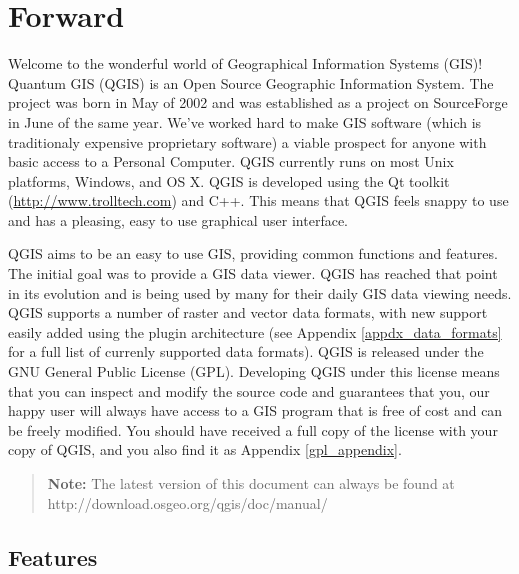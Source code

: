 
\section{Forward}\label{label_forward}
\setcounter{page}{1}

Welcome to the wonderful world of Geographical Information Systems (GIS)!
Quantum GIS (QGIS) is an Open Source Geographic Information System. The project
was born in May of 2002 and was established as a project on SourceForge in June
of the same year. We've worked hard to make GIS software (which is traditionaly
expensive proprietary software) a viable prospect for anyone with basic access
to a Personal Computer. QGIS currently runs on most Unix platforms, Windows, and
OS X. QGIS is developed using the Qt toolkit (\url{http://www.trolltech.com})
and C++. This means that QGIS feels snappy to use and has a pleasing, easy to
use graphical user interface. 

QGIS aims to be an easy to use GIS, providing common functions and features.
The initial goal was to provide a GIS data viewer. QGIS has reached that point
in its evolution and is being used by many for their daily GIS data viewing
needs. QGIS supports a number of raster and vector data formats, with new
support easily added using the plugin architecture (see Appendix
\ref{appdx_data_formats} for a full list of currenly supported data formats).
QGIS is released under the GNU General Public License (GPL). Developing QGIS 
under this license means that you can inspect and modify the source code
and guarantees that you, our happy user will always have access to a GIS
program that is free of cost and can be freely modified. You should have
received a full copy of the license with your copy of QGIS, and you also
find it as Appendix \ref{gpl_appendix}.  

\begin{quote}
\begin{center}
\textbf{Note:} The latest version of this document can always be found at \newline
http://download.osgeo.org/qgis/doc/manual/
\end{center}
\end{quote}

\subsection{Features}\label{label_majfeat}

